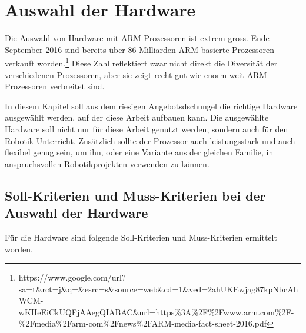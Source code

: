 \chapter{Auswahl der Hardware}
Die Auswahl von Hardware mit ARM-Prozessoren ist extrem gross.
Ende September 2016 sind bereits über 86 Milliarden ARM basierte Prozessoren verkauft worden.\footnote{https://www.google.com/url?sa=t\&rct=j\&q=\&esrc=s\&source=web\&cd=1\&ved=2ahUKEwjag87kpNbcAhWCM-wKHeEiCkUQFjAAegQIABAC\&url=https\%3A\%2F\%2Fwww.arm.com\%2F-\%2Fmedia\%2Farm-com\%2Fnews\%2FARM-media-fact-sheet-2016.pdf}%
Diese Zahl reflektiert zwar nicht direkt die Diversität der verschiedenen Prozessoren, aber sie zeigt recht gut wie enorm weit ARM Prozessoren verbreitet sind.

In diesem Kapitel soll aus dem riesigen Angebotsdschungel die richtige Hardware ausgewählt werden, auf der diese Arbeit aufbauen kann.
Die ausgewählte Hardware soll nicht nur für diese Arbeit genutzt werden, sondern auch für den Robotik-Unterricht.
Zusätzlich sollte der Prozessor auch leistungsstark und auch flexibel genug sein, um ihn, oder eine Variante aus der gleichen Familie, in anspruchsvollen Robotikprojekten verwenden zu können.


\section{Soll-Kriterien und Muss-Kriterien bei der Auswahl der Hardware}
Für die Hardware sind folgende Soll-Kriterien und Muss-Kriterien ermittelt worden.

